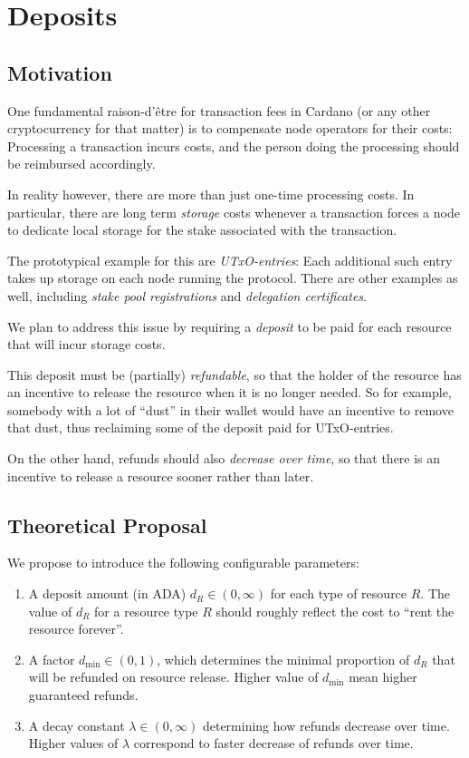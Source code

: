 \documentclass[11pt,a4paper]{article}
\begin{document}
\section{Deposits}
\label{deposits}

\subsection{Motivation}

One fundamental raison-d'\^{e}tre for transaction fees in Cardano (or any other
cryptocurrency for that matter) is to compensate node operators for their costs:
Processing a transaction incurs costs, and the person doing the processing
should be reimbursed accordingly.

In reality however, there are more than just one-time processing costs.
In particular, there are long term \emph{storage} costs whenever a transaction
forces a node to dedicate local storage for the stake associated with the
transaction.

The prototypical example for this are \emph{UTxO-entries}: Each additional such entry
takes up storage on each node running the protocol.
There are other examples as well, including \emph{stake pool registrations} and
\emph{delegation certificates}.

We plan to address this issue by requiring a \emph{deposit} to be paid for each
resource that will incur storage costs.

This deposit must be (partially) \emph{refundable},
so that the holder of the resource has an incentive to release the resource when
it is no longer needed. So for example, somebody with a lot of ``dust'' in their
wallet would have an incentive to remove that dust, thus reclaiming some of the
deposit paid for UTxO-entries.

On the other hand, refunds should also \emph{decrease over time}, so that
there is an incentive to release a resource sooner rather than later.

\subsection{Theoretical Proposal}

We propose to introduce the following configurable parameters:
\begin{enumerate}
    \item
        A deposit amount (in ADA) $d_R\in(0,\infty)$ for each type of resource
        $R$. The value of $d_R$ for a resource type $R$ should roughly reflect
        the cost to ``rent the resource forever''.
    \item
        A factor $d_{\min}\in(0,1)$, which determines the minimal proportion of
        $d_R$ that will be refunded on resource release. Higher value of
        $d_{\min}$ mean higher guaranteed refunds.
    \item
        A decay constant $\lambda\in(0,\infty)$ determining how refunds decrease
        over time. Higher values of $\lambda$ correspond to faster decrease of
        refunds over time.
\end{enumerate}
\end{document}
